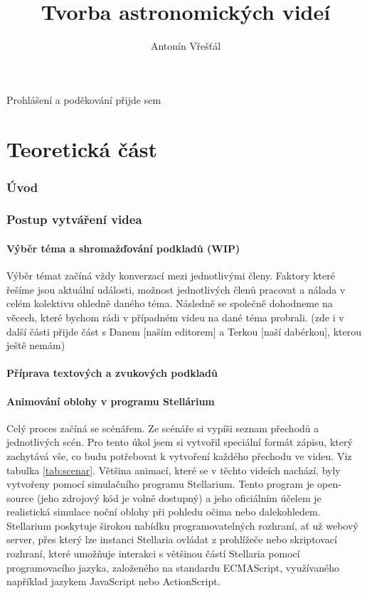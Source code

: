 \documentclass[12pt,a4paper,titlepage]{article}
\author{Antonín Vřešťál}
\title{Tvorba astronomických videí}
\begin{document}
\maketitle

\tableofcontents
\newpage
Prohlášení a poděkování přijde sem
\newpage
\part{Teoretická část}
\section{Úvod}
\section{Postup vytváření videa} \label{makingof}
\subsection{Výběr téma a shromažďování podkladů (WIP)}
Výběr témat začíná vždy konverzací mezi jednotlivými členy. Faktory které řešíme jsou aktuální události, možnost jednotlivých členů pracovat a nálada v celém kolektivu ohledně daného téma. Následně se společně dohodneme na věcech, které bychom rádi v případném videu na dané téma probrali. (zde i v další části přijde část s Danem [naším editorem] a Terkou [naší dabérkou], kterou ještě nemám)
\subsection{Příprava textových a zvukových podkladů}
\subsection{Animování oblohy v programu Stellárium} \label{makingof:stellarium}
Celý proces začíná se scénářem. Ze scénáře si vypíši seznam přechodů a jednotlivých scén. Pro tento úkol jsem si vytvořil speciální formát zápisu, který zachytává vše, co budu potřebovat k vytvoření každého přechodu ve videu. Viz tabulka \ref{tab:scenar}.
Většina animací, které se v těchto videích nachází, byly vytvořeny pomocí simulačního programu Stellarium. Tento program je open-source (jeho zdrojový kód je volně dostupný) a jeho oficiálním účelem je realistická simulace noční oblohy při pohledu očima nebo dalekohledem. Stellarium poskytuje širokou nabídku programovatelných rozhraní, ať už webový server, přes který lze instanci Stellaria ovládat z prohlížeče nebo skriptovací rozhraní, které umožňuje interakci s většinou částí Stellaria pomocí programovacího jazyka, založeného na standardu ECMAScript, využívaného například jazykem JavaScript nebo ActionScript.
\end{document}
